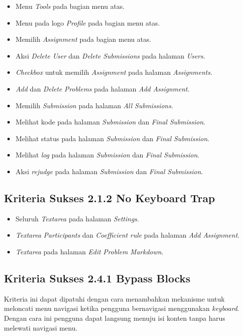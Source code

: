 \begin{itemize}
	\item Menu \textit{Tools} pada bagian menu atas.
	\item Menu pada logo \textit{Profile} pada bagian menu atas.
	\item Memilih \textit{Assignment} pada bagian menu atas.
	\item Aksi \textit{Delete User} dan \textit{Delete Submissions} pada halaman \textit{Users}.
	\item \textit{Checkbox} untuk memilih \textit{Assignment} pada halaman \textit{Assignments}.
	\item \textit{Add} dan \textit{Delete Problems} pada halaman \textit{Add Assignment}.
	\item Memilih \textit{Submission} pada halaman \textit{All Submissions}.
	\item Melihat kode pada halaman \textit{Submission} dan \textit{Final Submission}.
	\item Melihat status pada halaman \textit{Submission} dan \textit{Final Submission}.
	\item Melihat \textit{log} pada halaman \textit{Submission} dan \textit{Final Submission}.
	\item Aksi \textit{rejudge} pada halaman \textit{Submission} dan \textit{Final Submission}.
\end{itemize}

\subsection{Kriteria Sukses 2.1.2 No Keyboard Trap}
\label{subsec:peningkatan_A_2.1.2}

\begin{itemize}
	\item Seluruh \textit{Textarea} pada halaman \textit{Settings}.
	\item \textit{Textarea Participants} dan \textit{Coefficient rule} pada halaman \textit{Add Assignment}.
	\item \textit{Textarea} pada halaman \textit{Edit Problem Markdown}.
\end{itemize}

\subsection{Kriteria Sukses 2.4.1 Bypass Blocks}
\label{subsec:peningkatan_A_2.4.1}

Kriteria ini dapat dipatuhi dengan cara menambahkan mekanisme untuk meloncati menu navigasi ketika pengguna bernavigasi menggunakan \textit{keyboard}. Dengan cara ini pengguna dapat langsung menuju isi konten tanpa harus melewati navigasi menu.


